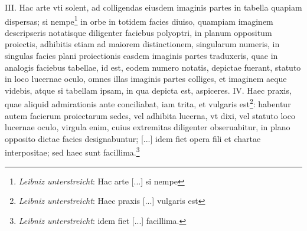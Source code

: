 \pend \pstart [p.~161] III. Hac arte vti solent, ad colligendas eiusdem imaginis partes in tabella quapiam dispersas; si nempe\footnote{\textit{Leibniz unterstreicht}: Hac arte [...] si nempe} in orbe in totidem facies diuiso, quampiam imaginem descripseris notatisque diligenter faciebus polyoptri, in  planum oppositum proiectis, adhibitis etiam ad maiorem distinctionem, singularum numeris, in singulas facies plani proiectionis easdem imaginis partes traduxeris, quae in analogis faciebus tabellae, id est, eodem numero notatis, depictae fuerant, statuto in loco lucernae  oculo, omnes illas imaginis partes colliges, et imaginem  aeque videbis, atque si tabellam ipsam, in qua depicta  est, aspiceres. IV. Haec praxis, quae aliquid admirationis ante conciliabat, iam trita, et vulgaris est\footnote{\textit{Leibniz unterstreicht}: Haec praxis [...] vulgaris est}: habentur autem facierum proiectarum sedes, vel adhibita lucerna, vt dixi, vel statuto loco lucernae oculo\protect{}, virgula enim, cuius  extremitas diligenter obseruabitur, in plano opposito dictae facies designabuntur; [...] idem fiet opera fili et chartae interpositae; sed haec sunt facillima.\footnote{\textit{Leibniz unterstreicht}: idem fiet [...] facillima.}